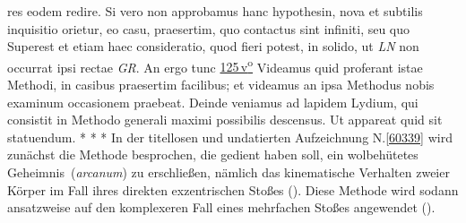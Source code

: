 res eodem redire.
Si vero non approbamus hanc hypothesin,%
nova et subtilis inquisitio orietur,%
%
eo casu,
praesertim,
quo contactus sint infiniti,%
%
seu quo
\pend%
\pstart%
Superest et etiam haec consideratio,%
quod fieri potest,
in solido,%
ut \textit{LN} non occurrat ipsi rectae \textit{GR}.
An ergo tunc
\lbrack%
\href{\Scan{LH_37_05_125v}}%
{125\,v\textsuperscript{o}}%
\rbrack%
\pend%
\pstart%
%
Videamus
quid proferant istae Methodi,%
in casibus praesertim facilibus;%
et videamus
an ipsa Methodus nobis examinum occasionem praebeat.%
%
%
Deinde veniamus ad lapidem Lydium,%
qui consistit in Methodo generali%
maximi possibilis descensus.%
Ut appareat quid sit statuendum.
\pend%
\vspace{6.0em}%
\pstart%
\noindent%
\centering%
*     *     *
\pend%
\newpage%
%
\frenchspacing%
\footnotesize%
\pstart%
\noindent%
%
In der titellosen und undatierten Aufzeichnung N.\;\ref{60339} wird zunächst die Methode besprochen, die %
gedient haben soll, ein wolbehütetes \glqq Geheimnis\grqq\ (\textit{arcanum}) zu erschließen, nämlich das kinematische Verhalten zweier Körper im Fall ihres direkten exzentrischen Stoßes ().
Diese Methode wird sodann ansatzweise auf den komplexeren Fall eines mehrfachen Stoßes angewendet ().
